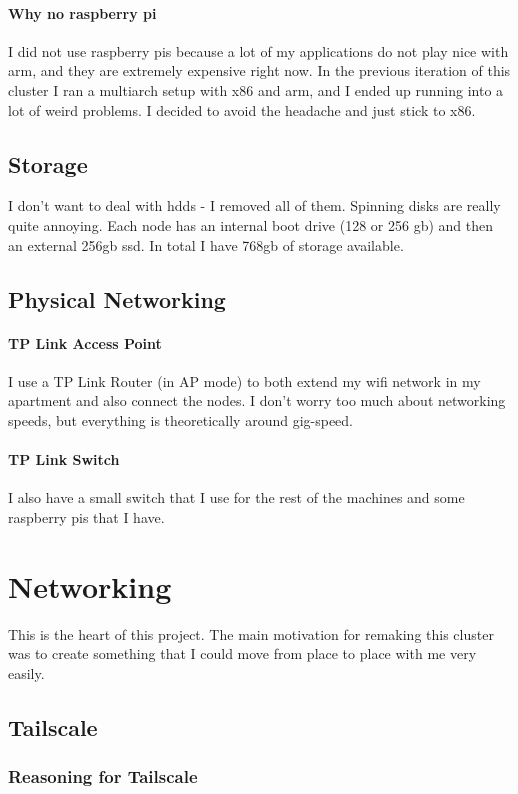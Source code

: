 \documentclass[12pt]{article}
\begin{document}
\paragraph{Why no raspberry pi}
I did not use raspberry pis because a lot of my applications do not play nice with arm, and they are extremely expensive right now. In the previous iteration of this cluster I ran a multiarch setup with x86 and arm, and I ended up running into a lot of weird problems. I decided to avoid the headache and just stick to x86.

\subsection{Storage}
I don't want to deal with hdds - I removed all of them. Spinning disks are really quite annoying. Each node has an internal boot drive (128 or 256 gb) and then an external 256gb ssd. In total I have 768gb of storage available.

\subsection{Physical Networking}
\paragraph{TP Link Access Point}
I use a TP Link Router (in AP mode) to both extend my wifi network in my apartment and also connect the nodes. I don't worry too much about networking speeds, but everything is theoretically around gig-speed.
\paragraph{TP Link Switch}
I also have a small switch that I use for the rest of the machines and some raspberry pis that I have.

\section{Networking}
This is the heart of this project. The main motivation for remaking this cluster was to create something that I could move from place to place with me very easily.
\subsection{Tailscale}
\subsubsection{Reasoning for Tailscale}
\end{document}
